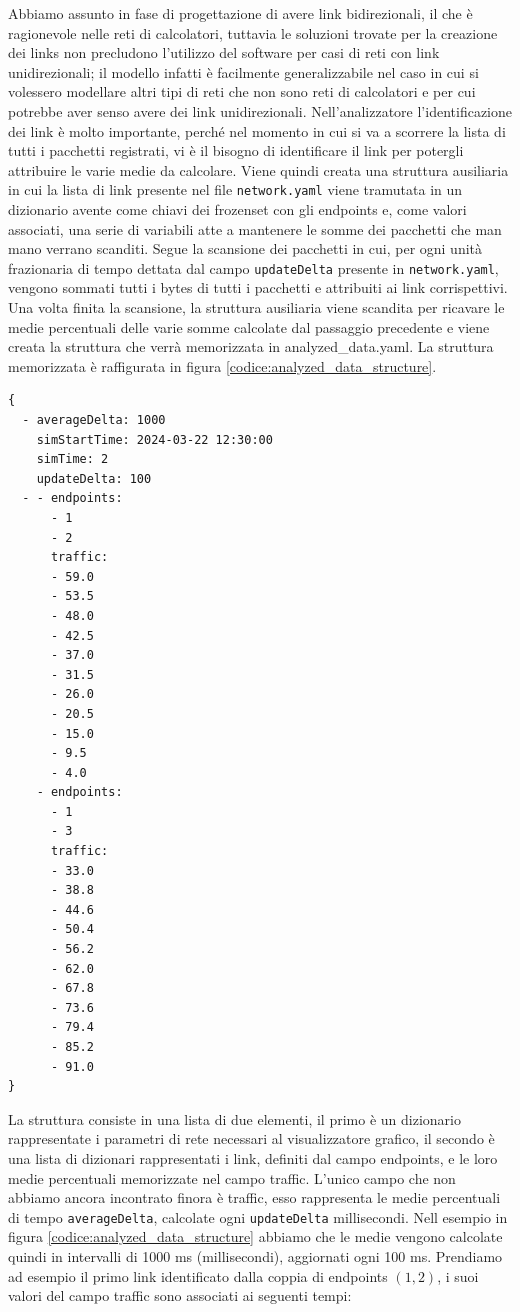 \documentclass[binding=0.6cm]{sapthesis}
\begin{document}
Abbiamo assunto in fase di progettazione di avere link bidirezionali, il che è ragionevole nelle reti di calcolatori, tuttavia le soluzioni trovate per la creazione dei links 
non precludono l'utilizzo del software per casi di reti con link unidirezionali; il modello infatti è facilmente generalizzabile nel caso in cui si 
volessero modellare altri tipi di reti che non sono reti di calcolatori e per cui potrebbe aver senso avere dei link unidirezionali.
Nell'analizzatore l'identificazione dei link è molto importante, perché nel momento in cui si va a scorrere la lista di tutti i pacchetti registrati,
vi è il bisogno di identificare il link per potergli attribuire le varie medie da calcolare. Viene quindi creata una struttura ausiliaria in cui
la lista di link presente nel file \texttt{network.yaml} viene tramutata in un dizionario avente come chiavi dei frozenset con gli endpoints e, come valori associati,
una serie di variabili atte a mantenere le somme dei pacchetti che man mano verrano scanditi.
Segue la scansione dei pacchetti in cui, per ogni unità frazionaria di tempo dettata dal campo \texttt{updateDelta} presente in \texttt{network.yaml}, vengono sommati tutti i bytes di tutti i pacchetti
e attribuiti ai link corrispettivi.
Una volta finita la scansione, la struttura ausiliaria viene scandita per ricavare le medie percentuali delle varie somme calcolate dal passaggio precedente e viene
creata la struttura che verrà memorizzata in analyzed\_data.yaml. La struttura memorizzata è raffigurata in figura \ref{codice:analyzed_data_structure}.

{\scriptsize %
\begin{lstlisting}[caption={Rappresentazione della struttura analyzed\_data}, label={codice:analyzed_data_structure}]
{
  - averageDelta: 1000
    simStartTime: 2024-03-22 12:30:00
    simTime: 2
    updateDelta: 100
  - - endpoints:
      - 1
      - 2
      traffic:
      - 59.0
      - 53.5
      - 48.0
      - 42.5
      - 37.0
      - 31.5
      - 26.0
      - 20.5
      - 15.0
      - 9.5
      - 4.0
    - endpoints:
      - 1
      - 3
      traffic:
      - 33.0
      - 38.8
      - 44.6
      - 50.4
      - 56.2
      - 62.0
      - 67.8
      - 73.6
      - 79.4
      - 85.2
      - 91.0
}
\end{lstlisting}
}

La struttura consiste in una lista di due elementi, il primo è un dizionario rappresentate 
i parametri di rete necessari al visualizzatore grafico, il
secondo è una lista di dizionari rappresentati i link, definiti dal campo endpoints, e le loro medie percentuali memorizzate nel campo traffic.
L'unico campo che non abbiamo ancora incontrato finora è traffic, esso rappresenta le medie percentuali di tempo \texttt{averageDelta}, calcolate ogni \texttt{updateDelta} millisecondi.
Nell esempio in figura \ref{codice:analyzed_data_structure} abbiamo che le medie vengono calcolate quindi in intervalli di 1000 ms (millisecondi), aggiornati ogni
100 ms. Prendiamo ad esempio il primo link identificato dalla coppia di endpoints \((1, 2)\), i suoi valori del campo traffic sono associati ai seguenti tempi:
\newline
\end{document}
